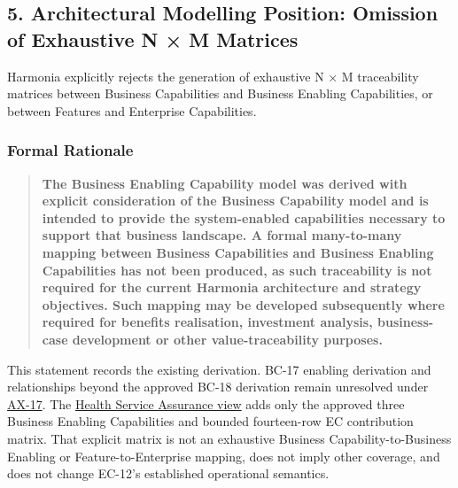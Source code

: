 \par\smallskip
{}\label{rad:tier-model:256}
\subsection*{5. Architectural Modelling Position: Omission of Exhaustive N × M Matrices}
\label{rad:tier-model:258}

Harmonia explicitly rejects the generation of exhaustive N × M traceability matrices between Business Capabilities and Business Enabling Capabilities, or between Features and Enterprise Capabilities.

\label{rad:tier-model:260}
\subsubsection*{Formal Rationale}
\label{rad:tier-model:262}

\begin{quote}

\textbf{The Business Enabling Capability model was derived with explicit consideration of the Business Capability model and is intended to provide the system-enabled capabilities necessary to support that business landscape. A formal many-to-many mapping between Business Capabilities and Business Enabling Capabilities has not been produced, as such traceability is not required for the current Harmonia architecture and strategy objectives. Such mapping may be developed subsequently where required for benefits realisation, investment analysis, business-case development or other value-traceability purposes.}


\end{quote}
\label{rad:tier-model:264}

This statement records the existing derivation. BC-17 enabling derivation and relationships beyond the approved BC-18 derivation remain unresolved under \href{https://github.com/fhirfactory/harmonia/blob/98410db60155198a75f74c79d98060070209faa1/docs/markdown/governance/architectural-axioms.md\#ax-17}{AX-17}. The \hyperref[rad:assurance-strategy]{Health Service Assurance view} adds only the approved three Business Enabling Capabilities and bounded fourteen-row EC contribution matrix. That explicit matrix is not an exhaustive Business Capability-to-Business Enabling or Feature-to-Enterprise mapping, does not imply other coverage, and does not change EC-12's established operational semantics.

